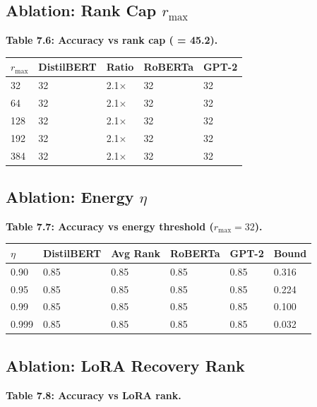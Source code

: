 \subsection{Ablation: Rank Cap $r_\text{max}$}

\textbf{Table 7.6: Accuracy vs rank cap (  = 45.2).}

\begin{table}[H]
\centering
\small
\begin{tabular}{lllll}
\toprule
\textbf{$r_\text{max}$} & \textbf{DistilBERT} & \textbf{Ratio} & \textbf{RoBERTa} & \textbf{GPT-2} \\
\midrule
32 & 32 & 2.1$\times$ & 32 & 32 \\
64 & 32 & 2.1$\times$ & 32 & 32 \\
128 & 32 & 2.1$\times$ & 32 & 32 \\
192 & 32 & 2.1$\times$ & 32 & 32 \\
384 & 32 & 2.1$\times$ & 32 & 32 \\
\bottomrule
\end{tabular}
\end{table}

\subsection{Ablation: Energy $\eta$}

\textbf{Table 7.7: Accuracy vs energy threshold ($r_\text{max} = 32$).}

\begin{table}[H]
\centering
\small
\begin{tabular}{llllll}
\toprule
\textbf{$\eta$} & \textbf{DistilBERT} & \textbf{Avg Rank} & \textbf{RoBERTa} & \textbf{GPT-2} & \textbf{Bound} \\
\midrule
0.90 & 0.85 & 0.85 & 0.85 & 0.85 & 0.316 \\
0.95 & 0.85 & 0.85 & 0.85 & 0.85 & 0.224 \\
0.99 & 0.85 & 0.85 & 0.85 & 0.85 & 0.100 \\
0.999 & 0.85 & 0.85 & 0.85 & 0.85 & 0.032 \\
\bottomrule
\end{tabular}
\end{table}

\subsection{Ablation: LoRA Recovery Rank}

\textbf{Table 7.8: Accuracy vs LoRA rank.}


